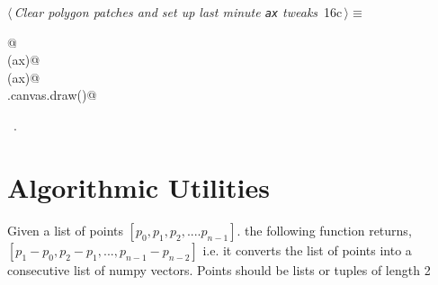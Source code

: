 \documentclass[11.5pt]{report}
\begin{document}
\begin{flushleft} \small
\begin{minipage}{\linewidth}\label{scrap10}\raggedright\small
{} $\langle\,${\itshape Clear polygon patches and set up last minute \verb|ax| tweaks}\nobreak\ {\footnotesize {16c}}$\,\rangle\equiv$
\vspace{-1ex}
\begin{list}{}{} \item
\mbox{}\verb@   @\\
\mbox{}\verb@clearAxPolygonPatches(ax)@\\
\mbox{}\verb@applyAxCorrection(ax)@\\
\mbox{}\verb@fig.canvas.draw()@\\
\mbox{}\verb@@{\NWsep}
\end{list}
\vspace{-1.5ex}
\footnotesize
\begin{list}{}{\setlength{\itemsep}{-\parsep}\setlength{\itemindent}{-\leftmargin}}
\item \NWtxtMacroRefIn\ .

\item{}
\end{list}
\end{minipage}\vspace{4ex}
\end{flushleft}

\section{Algorithmic Utilities}

\newchunk Given a list of  points $[p_0,p_1,p_2,....p_{n-1}]$. 
    the following function returns, $[p_1-p_0, p_2-p_1,...,p_{n-1}-p_{n-2}]$
    i.e. it converts the list of points into a consecutive list of numpy vectors. 
    Points should be lists or tuples of length 2
\end{document}
